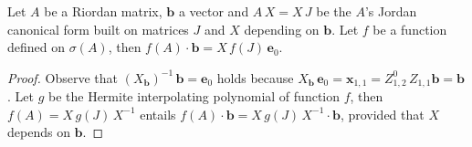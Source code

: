 \begin{theorem}
Let $A$ be a Riordan matrix, $\boldsymbol{b}$ a vector and $A\,X = X\,J$ be the
$A$'s Jordan canonical form built on matrices $J$ and $X$ depending on
$\boldsymbol{b}$.  Let $f$ be a function  defined on $\sigma(A)$, then
$f(A)\cdot\boldsymbol{b} = X\,f(J)\,\boldsymbol{e}_{0}$. 
\end{theorem}
\begin{proof}
Observe that
$\left(X_{\boldsymbol{b}}\right)^{-1}\,\boldsymbol{b}=\boldsymbol{e}_{0}$ holds
because $X_{\boldsymbol{b}}\,\boldsymbol{e}_{0}=\boldsymbol{x}_{1,1} =
Z_{1,2}^{0}\,Z_{1,1}\boldsymbol{b}=\boldsymbol{b}$.  Let $g$ be the Hermite
interpolating polynomial of function $f$, then $f(A) = X\,g(J)\,X^{-1}$ entails
$f(A)\cdot\boldsymbol{b} = X\,g(J)\,X^{-1}\cdot\boldsymbol{b}$, provided that
$X$ depends on $\boldsymbol{b}$.
\end{proof}
